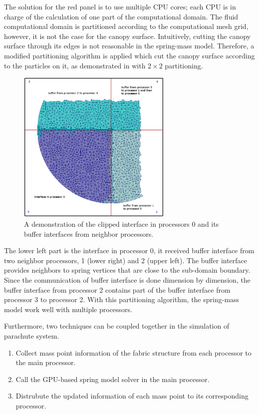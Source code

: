 The solution for the red panel is to use multiple CPU cores; each CPU is in
charge of the calculation of one part of the computational domain.
The fluid computational domain is partitioned according to the computational
mesh grid, however, it is not the case for the canopy surface.
Intuitively, cutting the canopy surface through its edges is not reasonable
in the spring-mass model.
Therefore, a modified partitioning algorithm is applied which cut the canopy
surface according to the particles on it, as demonstrated in
 with $2 \times 2$ partitioning.
\begin{figure}[!ht]
\centering
\includegraphics[width=0.66\textwidth]{figures/cpu_parallel}
\caption{A demonstration of the clipped interface in processors 0 and its
buffer interfaces from neighbor processors.}
\label{fig:cpu_parallel}
\end{figure}

The lower left part is the interface in processor 0, it received buffer
interface from two neighbor processors, 1 (lower right) and 2 (upper left).
The buffer interface provides neighbors to spring vertices that are close
to the sub-domain boundary.
Since the communication of buffer interface is done dimension by dimension,
the buffer interface from processor 2 contains part of the buffer interface
from processor 3 to processor 2.
With this partitioning algorithm, the spring-mass model work well with
multiple processors.

Furthermore, two techniques can be coupled together in the simulation of
parachute system.
\begin{enumerate}
\item Collect mass point information of the fabric structure from each
processor to the main processor.
\item Call the GPU-based spring model solver in the main processor.
\item Distrubute the updated information of each mass point to its
corresponding processor.
\end{enumerate}



\newpage
